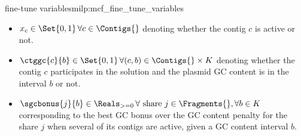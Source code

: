 \begin{definition}{\MCF{} fine-tune variables}{milp:mcf_fine_tune_variables}
  \begin{itemize}
    \item \(x_c \in \Set{0, 1} \, \forall c \in \Contigs{}\) denoting whether the contig \(c\) is active or not.
    \item \(\ctggc{c}{b} \in \Set{0, 1} \, \forall (c, b) \in \Contigs{} \times K\) denoting whether the contig \(c\) participates in the solution and the plasmid GC content is in the interval \(b\) or not.
    \item \(\sgcbonus{j}{b} \in \Reals_{>=0} \, \forall \text{ share } j \in \Fragments{}, \forall b \in K\) corresponding to the best GC bonus over the GC content penalty for the share \(j\) when several of its contigs are active, given a GC content interval \(b\).
  \end{itemize}
\end{definition}

